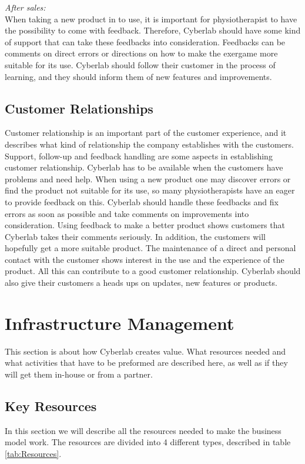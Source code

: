 \emph{After sales:}\\
When taking a new product in to use, it is important for physiotherapist to have the possibility to come with feedback. Therefore, Cyberlab should have some kind of support that can take these feedbacks into consideration. Feedbacks can be comments on direct errors or directions on how to make the exergame more suitable for its use. Cyberlab should follow their customer in the process of learning, and they should inform them of new features and improvements.  
\subsection{Customer Relationships}
Customer relationship is an important part of the customer experience, and it describes what kind of relationship the company establishes with the customers. Support, follow-up and feedback handling are some aspects in establishing customer relationship. Cyberlab has to be available when the customers have problems and need help. When using a new product one may discover errors or find the product not suitable for its use, so many physiotherapists have an eager to provide feedback on this. Cyberlab should handle these feedbacks and fix errors as soon as possible and take comments on improvements into consideration. Using feedback to make a better product shows customers that Cyberlab takes their comments seriously.  In addition, the customers will hopefully get a more suitable product. The maintenance of a direct and personal contact with the customer shows interest in the use and the experience of the product. All this can contribute to a good customer relationship. Cyberlab should also give their customers a heads ups on updates, new features or products.
\section{Infrastructure Management}
This section is about how Cyberlab creates value. What resources needed and what activities that have to be preformed are described here, as well as if they will get them in-house or from a partner. 

\subsection{Key Resources}

In this section we will describe all the resources needed to make the business model work. The resources are divided into 4 different types, described in table \ref{tab:Resources}.
\newpage

